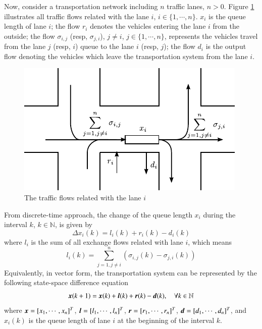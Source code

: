 \documentclass[preprint,authoryear,12pt]{elsarticle}
\renewcommand{\vec}[1]{\mbox{\boldmath$#1$}}
\begin{document}
Now, consider a transportation network including $n$ traffic lanes, $n>0$. Figure \ref{fig:flows} illustrates all traffic flows related with the lane $i$, $i\in\{1,\cdots,n\}$. $x_i$ is the queue length of lane $i$; the flow $r_i$ denotes the vehicles entering the lane $i$ from the outside; the flow $\sigma_{i,j}$ (resp, $\sigma_{j,i}$), $j\neq i$, $j\in\{1,\cdots,n\}$, represents the vehicles travel from the lane $j$ (resp, $i$) queue to the lane $i$ (resp, $j$); the flow $d_{i}$ is the output flow denoting the vehicles which leave the transportation system from the lane $i$.

\begin{figure}[ht]
  \centering
  \includegraphics{pics/flows}
  \caption{The traffic flows related with the lane $i$}
  \label{fig:flows}
\end{figure}

From discrete-time approach, the change of the queue length $x_i$ during the interval $k$, $k\in\mathbb{N}$, is given by
\begin{equation}\label{equ:mdl_gnl_lane}
\Delta x_i(k) = l_i(k)+r_i(k)-d_i(k)
\end{equation}
where $l_i$ is the sum of all exchange flows related with lane $i$, which means
\begin{equation}\label{equ:exchange_vehicle}
 l_i(k)=\sum_{j=1,j\neq i}^{n}(\sigma_{i,j}(k)-\sigma_{j,i}(k))
\end{equation}
Equivalently, in vector form, the transportation system can be represented by the following state-space difference equation
\begin{equation}\label{equ:mdl_gnl}
\vec{x}(k+1)=\vec{x}(k)+\vec{l}(k)+\vec{r}(k)-\vec{d}(k),\quad \forall k\in\mathbb{N}
\end{equation}
where $\vec{x}=[x_1,\cdots,x_n]^T$, $\vec{l}=[l_1,\cdots,l_n]^T$, $\vec{r}=[r_1,\cdots,r_n]^T$, $\vec{d}=[d_1,\cdots,d_n]^T$, and $x_i(k)$ is the queue length of lane $i$ at the beginning of the interval $k$.
\end{document}
